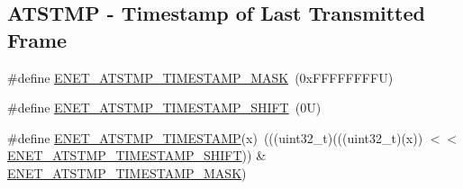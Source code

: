 \subsection*{A\+T\+S\+T\+MP -\/ Timestamp of Last Transmitted Frame}
\begin{DoxyCompactItemize}
\item 
\#define \mbox{\hyperlink{group___e_n_e_t___register___masks_gaed2e3431a926b017dc138606295ff909}{E\+N\+E\+T\+\_\+\+A\+T\+S\+T\+M\+P\+\_\+\+T\+I\+M\+E\+S\+T\+A\+M\+P\+\_\+\+M\+A\+SK}}~(0x\+F\+F\+F\+F\+F\+F\+F\+F\+U)
\item 
\#define \mbox{\hyperlink{group___e_n_e_t___register___masks_ga32c08f5d3821f0f0ff1f40b4ec0de035}{E\+N\+E\+T\+\_\+\+A\+T\+S\+T\+M\+P\+\_\+\+T\+I\+M\+E\+S\+T\+A\+M\+P\+\_\+\+S\+H\+I\+FT}}~(0\+U)
\item 
\#define \mbox{\hyperlink{group___e_n_e_t___register___masks_gaddba4ddcc6f73e074fa2cfae50028ac9}{E\+N\+E\+T\+\_\+\+A\+T\+S\+T\+M\+P\+\_\+\+T\+I\+M\+E\+S\+T\+A\+MP}}(x)~(((uint32\+\_\+t)(((uint32\+\_\+t)(x)) $<$$<$ \mbox{\hyperlink{group___e_n_e_t___register___masks_ga32c08f5d3821f0f0ff1f40b4ec0de035}{E\+N\+E\+T\+\_\+\+A\+T\+S\+T\+M\+P\+\_\+\+T\+I\+M\+E\+S\+T\+A\+M\+P\+\_\+\+S\+H\+I\+FT}})) \& \mbox{\hyperlink{group___e_n_e_t___register___masks_gaed2e3431a926b017dc138606295ff909}{E\+N\+E\+T\+\_\+\+A\+T\+S\+T\+M\+P\+\_\+\+T\+I\+M\+E\+S\+T\+A\+M\+P\+\_\+\+M\+A\+SK}})
\end{DoxyCompactItemize}
